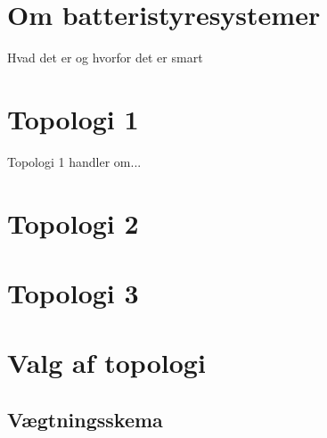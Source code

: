 \section{Om batteristyresystemer}
Hvad det er og hvorfor det er smart
\section{Topologi 1}

Topologi 1 handler om...

\section{Topologi 2}

\section{Topologi 3}

\section{Valg af topologi}

\subsection{Vægtningsskema}